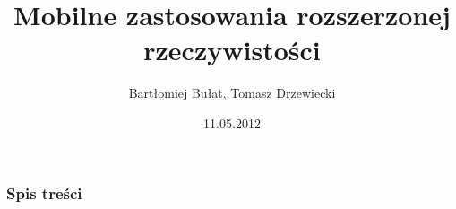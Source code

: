 \documentclass{beamer}
\title[Mobilne zastosowania rozszerzonej rzeczywistości]{Mobilne zastosowania rozszerzonej rzeczywistości}
\author[B. Bułat, T. Drzewiecki]{Bartłomiej Bułat, Tomasz Drzewiecki}
\date[2012]{11.05.2012}
\institute[AGH]
{Wydział EAIiE\\ 
Katedra Automatyki
}
\begin{document}
{
 \begin{frame}
   \titlepage
 \end{frame}
}


\begin{frame}
  \frametitle{Spis treści}
  \tableofcontents[hidesubsections]
\end{frame}

\newcommand{\nextoc}{%
  \begin{frame}\frametitle{Spis treści}\tableofcontents[hidesubsections]\end{frame}}






\end{document}
